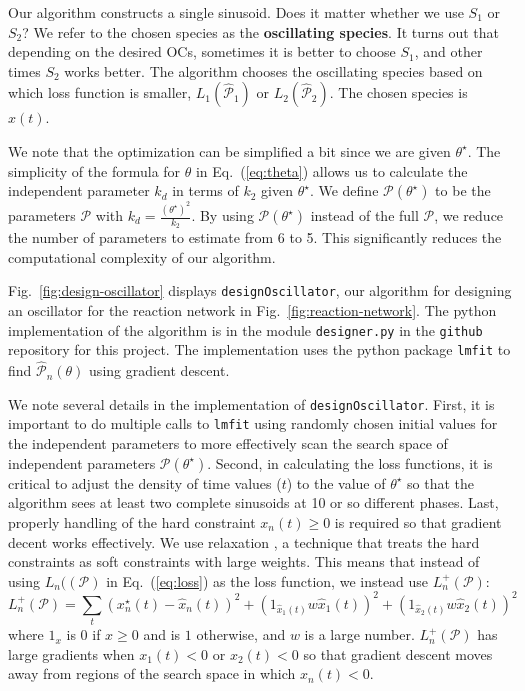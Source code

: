 \documentclass{bmcart}
\newcommand{\eqn}[1]{Eq.~(\ref{#1})}
\newcommand{\fig}[1]{Fig.~\ref{#1}}
\begin{document}
Our algorithm constructs a single sinusoid. Does it matter whether we use $S_1$ or $S_2$? We refer to the chosen species as the {\bf oscillating species}. It turns out that depending on the desired OCs, sometimes it is better to choose $S_1$, and other times $S_2$ works better. The algorithm chooses the oscillating species based on which loss function is smaller, $L_1 (\hat{\mathcal{P}}_1)$ or $L_2 (\hat{\mathcal{P}}_2)$. The chosen species is $\hat{x} (t).$

We note that the optimization can be simplified a bit since we are given $\theta^{\star}$. The simplicity of the formula for $\theta$ in \eqn{eq:theta} allows us to calculate the independent parameter $k_d$ in terms of $k_2$ given $\theta^{\star}$. We define $\mathcal{P}(\theta^{\star})$ to be the parameters $\mathcal{P}$ with
$k_d = \frac{(\theta^{\star})^2}{k_2}$. By using $\mathcal{P} (\theta^{\star})$ instead of the full $\mathcal{P}$, we reduce the number of parameters to estimate from 6 to 5. This significantly reduces the computational complexity of our algorithm.

\fig{fig:design-oscillator} displays {\tt designOscillator}, our algorithm for designing an oscillator for the reaction network in \fig{fig:reaction-network}. The python implementation of the algorithm is in the module {\tt designer.py} in the {\tt github} repository for this project. The implementation uses the python package {\tt lmfit} to find {$\hat{\mathcal{P}}_n (\theta)$} using gradient descent.

We note several details in the implementation of {\tt designOscillator}. First, it is important to do multiple calls to {\tt lmfit} using randomly chosen initial values for the independent parameters to more effectively scan the search space of independent parameters $\mathcal{P}(\theta^{\star})$. Second, in calculating the loss functions, it is critical to adjust the density of time values ($t$) to the value of $\theta^{\star}$ so that the algorithm sees at least two complete sinusoids at 10 or so different phases. Last, properly handling of the hard constraint $x_n(t) \geq 0$ is required so that gradient decent works effectively. We use relaxation \cite{boyd_2004}, a technique that treats the hard constraints as soft constraints with large weights. This means that instead of using $L_n((\mathcal{P})$ in \eqn{eq:loss} as the loss function, we instead use $L^+_n(\mathcal{P})$:
\begin{equation}
   L_n^{+} (\mathcal{P}) = \sum_t \left( x^{\star}_n(t) -\hat{x}_n(t) \right) ^ 2  + \left(1_{\hat{x}_1(t)} w \hat{x}_1 (t) \right)^2 + \left( 1_{\hat{x}_2(t)} w \hat{x}_2 (t) \right)^2
\end{equation}
where $1_x$ is 0 if $x \geq 0$ and is $1$ otherwise, and $w$ is a large number.
$L_n^{+} (\mathcal{P})$ has large gradients when $x_1(t) <0$ or $x_2(t) < 0$ so that gradient descent moves away from regions of the search space in which $x_n(t) < 0.$
\end{document}
